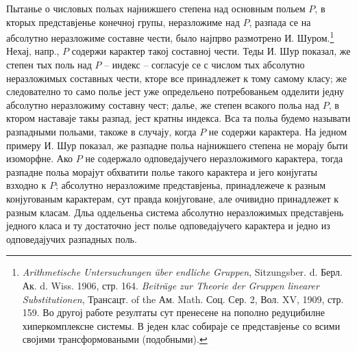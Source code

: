 \documentclass[11pt]{article}
\begin{document}
\setcounter{footnote}{0}

\noindent Пытанье о числовых польах најнижшего степена над основным польем $P$, в кторых представјенье конечној групы, неразложиме над $P$, разпада се на абсолутно неразложиме составне чести, было најпрво размотрено И. Шуром.\footnote{\emph{Arithmetische Untersuchungen über endliche Gruppen}, Sitzungsber. d. Берл. Ак. d. Wiss. 1906, стр. 164. \emph{Beiträge zur Theorie der Gruppen linearer Substitutionen}, Трансацт. of the Ам. Math. Соц. Сер. 2, Вол. XV, 1909, стр. 159. Во другој работе резултаты сут пренесене на пополно редуцибилне хиперкомплексне системы. В једен клас собираје се представјенье со всими својими трансформоваными (подобными).} Нехај, напр., $P$ содержи карактер такој составној чести. Теды И. Шур показал, же степен тых поль над $P$ -- индекс -- согласује се с числом тых абсолутно неразложимых составных чести, кторе все принадлежет к тому самому класу; же следователно то само полье јест уже определьено потребованьем одделити једну абсолутно неразложиму составну чест; далье, же степен всакого польа над $P$, в ктором наставаје такы разпад, јест кратны индекса. Вса та польа будемо называти разпадными польами, такоже в случају, когда $P$ не содержи карактера. На једном примеру И. Шур показал, же разпадне польа најнижшего степена не морају быти изоморфне. Ако $P$ не содержало одповедајучего неразложимого карактера, тогда разпадне польа морајут обхватити полье такого карактера и јего конјугаты взходно к $P$; абсолутно неразложиме представјеньа, принадлежече к разным конјугованым карактерам, сут правда конјуговане, але очивидно принадлежет к разным класам. Дльа оддельеньа система абсолутно неразложимых представјень једного класа и ту достаточно јест полье одповедајучего карактера и једно из одповедајучих разпадных поль.
\end{document}
